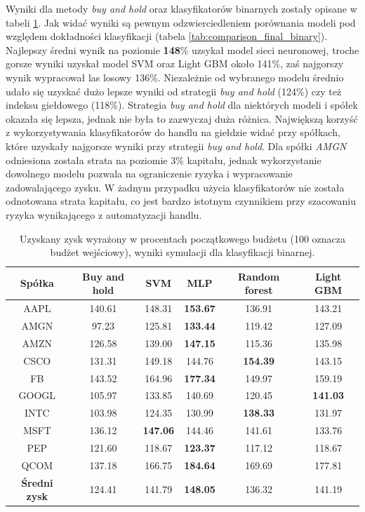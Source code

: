 \documentclass[a4paper, twoside, 11pt, openright]{article}
\begin{document}
\bigskip

Wyniki dla metody \textit{buy and hold} oraz klasyfikatorów binarnych zostały opisane w tabeli \ref{tab:comparison_simulation_binary}. Jak widać wyniki są pewnym odzwierciedleniem porównania modeli pod względem dokładności klasyfikacji (tabela \ref{tab:comparison_final_binary}). Najlepszy średni wynik na poziomie \textbf{148}\% uzsykał model sieci neuronowej, troche gorsze wyniki uzyskał model SVM oraz Light GBM około 141\%, zaś najgorszy wynik wypracował las losowy 136\%. Niezależnie od wybranego modelu średnio udało się uzyskać dużo lepsze wyniki od strategii \textit{buy and hold} (124\%) czy też indeksu giełdowego (118\%). Strategia \textit{buy and hold} dla niektórych modeli i spółek okazała się lepsza, jednak nie była to zazwyczaj duża różnica. Największą korzyść z wykorzystywania klasyfikatorów do handlu na giełdzie widać przy spółkach, które uzyskały najgorsze wyniki przy strategii \textit{buy and hold}. Dla spółki \textit{AMGN} odniesiona została strata na poziomie 3\% kapitału, jednak wykorzystanie dowolnego modelu pozwala na ograniczenie ryzyka i wypracowanie zadowalającego zysku. W żadnym przypadku użycia klasyfikatorów nie została odnotowana strata kapitału, co jest bardzo istotnym czynnikiem przy szacowaniu ryzyka wynikającego z automatyzacji handlu.

 \begin{table}[H]
    \centering
    \begin{tabular}{|c|c|c|c|c|c|}
    \hline
        \textbf{Spółka}  & \textbf{Buy and hold} & \textbf{SVM} &  \textbf{MLP}  &  \textbf{Random forest}  &  \textbf{Light GBM} \\ \hline
AAPL & 140.61 & 148.31  &  \textbf{153.67} & 136.91 & 143.21\\ \hline
AMGN & 97.23 &  125.81 & \textbf{133.44}  & 119.42 &  127.09 \\ \hline
AMZN & 126.58 &  139.00 & \textbf{147.15} & 115.36 & 135.98 \\ \hline
CSCO & 131.31 & 149.18  & 144.76  & \textbf{154.39} &  143.15 \\ \hline
FB   & 143.52 & 164.96  & \textbf{177.34} & 149.97 & 159.19 \\ \hline
GOOGL & 105.97 &  133.85 &  140.69 & 120.45 & \textbf{141.03} \\ \hline
INTC & 103.98 & 124.35  & 130.99  & \textbf{138.33} & 131.97 \\ \hline
MSFT &  136.12 & \textbf{147.06}  &  144.46  & 141.61 & 133.76 \\ \hline
PEP  & 121.60 &  118.67 &  \textbf{123.37} & 117.12 & 118.67 \\ \hline
QCOM & 137.18 &  166.75 &  \textbf{184.64} & 169.69 & 177.81  \\ \hline \hline
\textbf{Średni zysk} & 124.41 & 141.79 & \textbf{148.05} &  136.32 & 141.19 \\  \hline  
    \end{tabular}
    \caption{Uzyskany zysk wyrażony w procentach początkowego budżetu (100 oznacza budżet wejściowy), wyniki symulacji dla klasyfikacji binarnej.}
    \label{tab:comparison_simulation_binary}
\end{table}   
\end{document}
